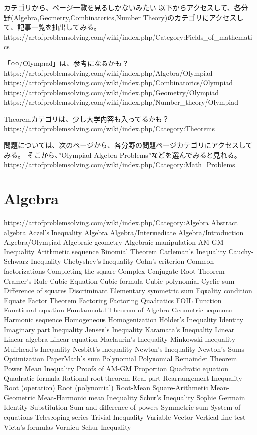 カテゴリから、ページ一覧を見るしかないみたい
以下からアクセスして、各分野(Algebra,Geometry,Combinatorics,Number Theory)のカテゴリにアクセスして、記事一覧を抽出してみる。
https://artofproblemsolving.com/wiki/index.php/Category:Fields_of_mathematics


「○○/Olympiad」は、参考になるかも？
https://artofproblemsolving.com/wiki/index.php/Algebra/Olympiad
https://artofproblemsolving.com/wiki/index.php/Combinatorics/Olympiad
https://artofproblemsolving.com/wiki/index.php/Geometry/Olympiad
https://artofproblemsolving.com/wiki/index.php/Number_theory/Olympiad

Theoremカテゴリは、少し大学内容も入ってるかも？
https://artofproblemsolving.com/wiki/index.php/Category:Theorems


問題については、次のページから、各分野の問題ページカテゴリにアクセスしてみる。
そこから、''Olympiad Algebra Problems''などを選んでみると見れる。
https://artofproblemsolving.com/wiki/index.php/Category:Math_Problems

\section{Algebra}
https://artofproblemsolving.com/wiki/index.php/Category:Algebra
Abstract algebra
Aczel's Inequality
Algebra
Algebra/Intermediate
Algebra/Introduction
Algebra/Olympiad
Algebraic geometry
Algebraic manipulation
AM-GM Inequality
Arithmetic sequence
Binomial Theorem
Carleman's Inequality
Cauchy-Schwarz Inequality
Chebyshev's Inequality
Cohn's criterion
Common factorizations
Completing the square
Complex Conjugate Root Theorem
Cramer's Rule
Cubic Equation
Cubic formula
Cubic polynomial
Cyclic sum
Difference of squares
Discriminant
Elementary symmetric sum
Equality condition
Equate
Factor Theorem
Factoring
Factoring Quadratics
FOIL
Function
Functional equation
Fundamental Theorem of Algebra
Geometric sequence
Harmonic sequence
Homogeneous
Homogenization
Hölder's Inequality
Identity
Imaginary part
Inequality
Jensen's Inequality
Karamata's Inequality
Linear
Linear algebra
Linear equation
Maclaurin's Inequality
Minkowski Inequality
Muirhead's Inequality
Nesbitt's Inequality
Newton's Inequality
Newton's Sums
Optimization
PaperMath’s sum
Polynomial
Polynomial Remainder Theorem
Power Mean Inequality
Proofs of AM-GM
Proportion
Quadratic equation
Quadratic formula
Rational root theorem
Real part
Rearrangement Inequality
Root (operation)
Root (polynomial)
Root-Mean Square-Arithmetic Mean-Geometric Mean-Harmonic mean Inequality
Schur's Inequality
Sophie Germain Identity
Substitution
Sum and difference of powers
Symmetric sum
System of equations
Telescoping series
Trivial Inequality
Variable
Vector
Vertical line test
Vieta's formulas
Vornicu-Schur Inequality

